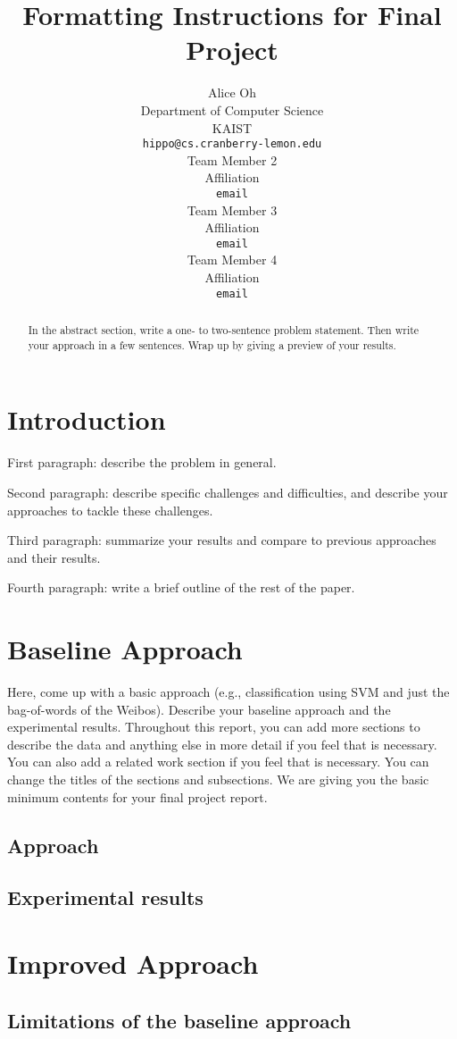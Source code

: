 \documentclass{article} %
\title{Formatting Instructions for Final Project}
\author{
Alice Oh \\
Department of Computer Science\\
KAIST\\
\texttt{hippo@cs.cranberry-lemon.edu} \\
\And
Team Member 2 \\
Affiliation \\
\texttt{email} \\
\AND
Team Member 3 \\
Affiliation \\
\texttt{email} \\
\And
Team Member 4 \\
Affiliation \\
\texttt{email} 
}
\begin{document}
\maketitle

\begin{abstract}
In the abstract section, write a one- to two-sentence problem statement. Then write your approach in a few sentences. Wrap up by giving a preview of your results.
\end{abstract}

\section{Introduction}
First paragraph: describe the problem in general.

Second paragraph: describe specific challenges and difficulties, and describe your approaches to tackle these challenges.

Third paragraph: summarize your results and compare to previous approaches and their results.

Fourth paragraph: write a brief outline of the rest of the paper.

\section{Baseline Approach}
Here, come up with a basic approach (e.g., classification using SVM and just the bag-of-words of the Weibos). Describe your baseline approach and the experimental results. Throughout this report, you can add more sections to describe the data and anything else in more detail if you feel that is necessary. You can also add a related work section if you feel that is necessary. You can change the titles of the sections and subsections. We are giving you the basic minimum contents for your final project report.
\subsection{Approach}
\subsection{Experimental results}

\section{Improved Approach}
\subsection{Limitations of the baseline approach}
\end{document}
